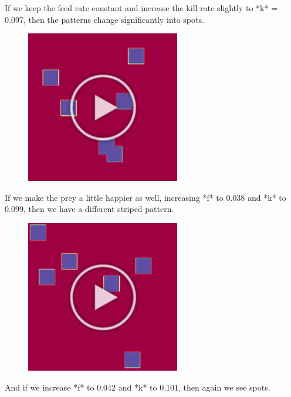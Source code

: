 {{If we keep the feed rate constant and increase the kill rate slightly to *k* = 0.097, then the patterns change significantly into spots.

\begin{figure}[h]
\centering
\mySfFamily
\includegraphics[width = 0.6\textwidth]{../assets/images/600px/gray-scott_f34_k63_first_frame.png}
\caption{}
\label{fig:gray-scott_f34_k63_first_frame}
\end{figure}

If we make the prey a little happier as well, increasing  *f* to 0.038 and *k* to 0.099, then we have a different striped pattern.

\begin{figure}[h]
\centering
\mySfFamily
\includegraphics[width = 0.6\textwidth]{../assets/images/600px/gray-scott_f38_k61_first_frame.png}
\caption{}
\label{fig:gray-scott_f38_k61_first_frame}
\end{figure}

And if we increase *f* to 0.042 and *k* to 0.101, then again we see spots.

}}
